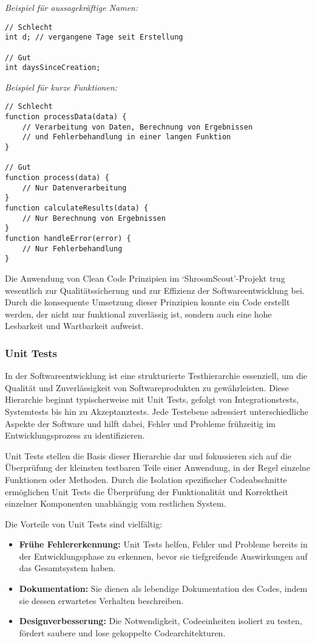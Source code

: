 \documentclass[../main.tex]{subfiles} %
\begin{document}
\textit{Beispiel für aussagekräftige Namen:}
\begin{verbatim}
// Schlecht
int d; // vergangene Tage seit Erstellung

// Gut
int daysSinceCreation;
\end{verbatim}

\textit{Beispiel für kurze Funktionen:}
\begin{verbatim}
// Schlecht
function processData(data) {
    // Verarbeitung von Daten, Berechnung von Ergebnissen
    // und Fehlerbehandlung in einer langen Funktion
}

// Gut
function process(data) {
    // Nur Datenverarbeitung
}
function calculateResults(data) {
    // Nur Berechnung von Ergebnissen
}
function handleError(error) {
    // Nur Fehlerbehandlung
}
\end{verbatim}

Die Anwendung von Clean Code Prinzipien im `ShroomScout'-Projekt trug wesentlich zur Qualitätssicherung und zur Effizienz der Softwareentwicklung bei. Durch
die konsequente Umsetzung dieser Prinzipien konnte ein Code erstellt werden, der nicht nur funktional zuverlässig ist, sondern auch eine hohe Lesbarkeit und
Wartbarkeit aufweist.

\subsubsection{Unit Tests}

In der Softwareentwicklung ist eine strukturierte Testhierarchie essenziell, um die Qualität und Zuverlässigkeit von Softwareprodukten zu gewährleisten. Diese
Hierarchie beginnt typischerweise mit Unit Tests, gefolgt von Integrationstests, Systemtests bis hin zu Akzeptanztests. Jede Testebene adressiert unterschiedliche
Aspekte der Software und hilft dabei, Fehler und Probleme frühzeitig im Entwicklungsprozess zu identifizieren.

Unit Tests stellen die Basis dieser Hierarchie dar und fokussieren sich auf die Überprüfung der kleinsten testbaren Teile einer Anwendung, in der Regel einzelne
Funktionen oder Methoden. Durch die Isolation spezifischer Codeabschnitte ermöglichen Unit Tests die Überprüfung der Funktionalität und Korrektheit einzelner
Komponenten unabhängig vom restlichen System.

Die Vorteile von Unit Tests sind vielfältig:

\begin{itemize}

	\item \textbf{Frühe Fehlererkennung:}
	      Unit Tests helfen, Fehler und Probleme bereits in der Entwicklungsphase zu erkennen, bevor sie tiefgreifende Auswirkungen auf das Gesamtsystem haben.

	\item \textbf{Dokumentation:}
	      Sie dienen als lebendige Dokumentation des Codes, indem sie dessen erwartetes Verhalten beschreiben.

	\item \textbf{Designverbesserung:}
	      Die Notwendigkeit, Codeeinheiten isoliert zu testen, fördert saubere und lose gekoppelte Codearchitekturen.

\end{itemize}
\end{document}

